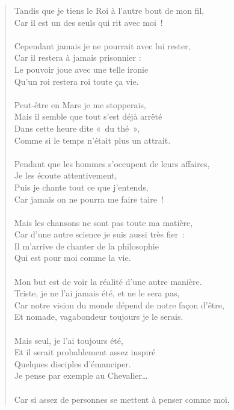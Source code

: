 {{\begin{verse}
Tandis que je tiens le Roi à l’autre bout de mon fil, \\
Car il est un des seuls qui rit avec moi~! \\
~\\
Cependant jamais je ne pourrait avec lui rester, \\
Car il restera à jamais prisonnier : \\
Le pouvoir joue avec une telle ironie \\
Qu’un roi restera roi toute ça vie. \\
~\\
Peut-être en Mars je me stopperais, \\
Mais il semble que tout s’est déjà arrêté \\
Dans cette heure dite «~du thé~», \\
Comme si le temps n’était plus un attrait. \\
~\\
Pendant que les hommes s’occupent de leurs affaires, \\
Je les écoute attentivement, \\
Puis je chante tout ce que j’entends, \\
Car jamais on ne pourra me faire taire~! \\
~\\
Mais les chansons ne sont pas toute ma matière, \\
Car d’une autre science je suis aussi très fier~: \\
Il m’arrive de chanter de la philosophie \\
Qui est pour moi comme la vie. \\
~\\
Mon but est de voir la réalité d’une autre manière. \\
Triste, je ne l’ai jamais été, et ne le sera pas, \\
Car notre vision du monde dépend de notre façon d’être, \\
Et nomade, vagabondeur toujours je le serais. \\
~\\
Mais seul, je l’ai toujours été, \\
Et il serait probablement assez inspiré \\
Quelques disciples d’émanciper. \\
Je pense par exemple au Chevalier… \\
~\\
Car si assez de personnes se mettent à penser comme moi, \\

\end{verse}}}
